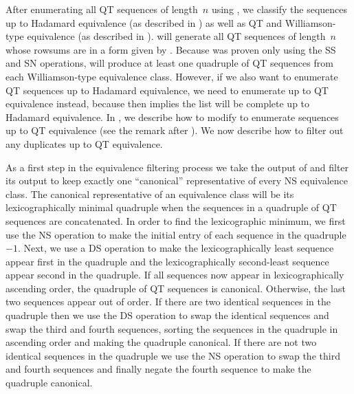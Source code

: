 \documentclass[12pt]{article}
\numberwithin{equation}{section}
\begin{document}
After enumerating all QT sequences of length~$n$ using , we classify the sequences
up to Hadamard equivalence (as described in ) as well as
QT and Williamson-type equivalence (as described in ).
 will generate all QT sequences of length~$n$ whose rowsums are in a form
given by .  Because  was proven only using the SS and SN operations,
 will produce at least one quadruple
of QT sequences from each Williamson-type equivalence class.
However, if we also want to enumerate QT sequences up to Hadamard equivalence, we need
to enumerate up to QT equivalence instead, because then 
implies the list will be complete up to Hadamard equivalence.
In , we describe how to modify  to enumerate
sequences up to QT equivalence (see the remark after ).
We now describe how to filter out any duplicates up to QT equivalence.

As a first step in the equivalence filtering process
we take the output of  and filter its output to
keep exactly one ``canonical'' representative of every NS equivalence class.  The canonical representative
of an equivalence class will be
its lexicographically minimal quadruple when the sequences in a quadruple of QT sequences are concatenated.
In order to find the lexicographic minimum, we first use the NS operation to make the initial entry
of each sequence in the quadruple $-1$.  Next, we use a DS operation to make the lexicographically
least sequence appear first in the quadruple and the lexicographically second-least sequence appear
second in the quadruple.  If all sequences now appear in lexicographically ascending order, the
quadruple of QT sequences is canonical.  Otherwise, the last two sequences appear out of order.
If there are two identical sequences in the quadruple then
we use the DS operation to swap the identical sequences and swap the third and fourth sequences, sorting the sequences in
the quadruple in ascending order and making the quadruple canonical.  If there are not two identical
sequences in the quadruple we use the NS operation to swap the third and fourth sequences
and finally negate the fourth sequence to make the quadruple canonical.
\end{document}
